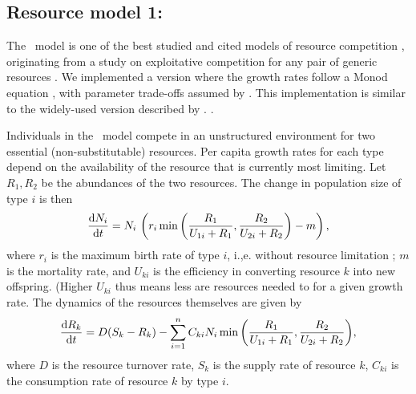 \documentclass[a4paper,11pt]{article}
\newcommand{\verify}[1]{{\color{navy}{(verify: #1)}}}
\newcommand{\todo}[1]{{\color{navy}{(todo: #1)}}}
\begin{document}
\subsection{Resource model 1: \Rstar }

The \Rstar\ model is one of the best studied and cited models of resource competition \citep{Tilman-1977, Tilman-1982, Huisman-2001}, originating from a study on exploitative competition for any pair of generic resources \citep{Leon-1975}. We implemented a version where the growth rates follow a Monod equation \citep{Huisman-2001}, with parameter trade-offs assumed by \citet{Fox-2008}. This implementation is similar to the widely-used version described by \citet{Tilman-1977, Tilman-1982}. \verify{ What is the difference with Tilman 1977?}. 

\todo{I have shifted the model description from the appendix back into the main text, and tried to make it more streamlined. GJK - please review to ensure no meaning has been lost. }

Individuals in the \Rstar\ model compete in an unstructured environment for two essential (non-substitutable) resources. Per capita growth rates for each type depend on the availability of the resource that is currently most limiting. Let $R_1, R_2$ be the abundances of the two resources. The change in population size of type $i$ is then
\begin{equation}
  \label{eq:rstar-n}
  \frac{\mathrm{d} N_i}{\mathrm{d} t} = N_i \, \left(r_i \min\left(\frac{R_1}{U_{1i} + R_1}, \frac{R_2}{U_{2i} + R_2}\right) - m\right),
\end{equation}
where $r_i$ is the maximum birth rate of type $i$, i.,e. without resource limitation \verify{true?}; $m$ is the mortality rate, and $U_{ki}$ is the efficiency in converting resource $k$ into new offspring. (Higher $U_{ki}$ thus means less are resources needed to for a given growth rate. The dynamics of the resources themselves are given by
\begin{equation}
  \label{eq:rstar-r}
  \frac{\mathrm{d} R_k}{\mathrm{d} t} =
  D (S_k - R_k) - \sum_{i=1}^n {C_{ki} N_i
    \min\left(\frac{R_1}{U_{1i} + R_1}, \frac{R_2}{U_{2i} + R_2}\right)},
\end{equation}
where $D$ is the resource turnover rate, $S_k$ is the supply rate of resource $k$, $C_{ki}$ is the consumption rate \verify{consumption rate or resource content?} of resource $k$ by type $i$. 
\todo{previous text discussed setting C= U, is this still relevant?} 
\todo{previous text said C did not vary among species. Should we mention that here? }
\end{document}
